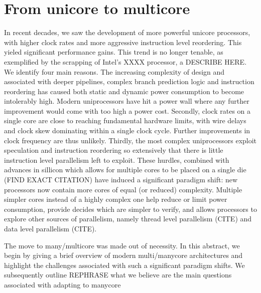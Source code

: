 \section{From unicore to multicore}

In recent decades, we saw the development of more powerful
unicore processors, with higher clock rates and more
aggressive instruction level reordering. This yieled
significant performance gains. This trend is no longer
tenable, as exemplified by the scrapping of Intel's
XXXX processor, a DESCRIBE HERE. We identify
four main reasons. The increasing complexity
of design and associated with deeper pipelines,
complex branch prediction logic and instruction
reordering has caused both static and dynamic power consumption
to become intolerably high. Modern uniprocessors have hit
a power wall where any further improvement would come
with too high a power cost. Secondly, clock rates on
a single core are close to reaching fundamental hardware limits,
with wire delays and clock skew dominating within a single clock cycle.
Further improvements in clock frequency are thus unlikely. Thirdly, the most
complex uniprocessors exploit speculation and instruction reordering so
extensively that there is little instruction level parallelism left to
exploit. These hurdles, combined with advances in sillicon which allows
for multiple cores to be placed on a single die (FIND EXACT CITATION)
have induced a significant paradigm shift: new processors now contain
more cores of equal (or reduced) complexity. Multiple simpler cores
instead of a highly complex one help reduce or limit power consumption,
provide decides which are simpler to verify, and allows processors
to explore other sources of parallelism, namely thread level parallelism (CITE)
and data level parallelism (CITE).

The move to many/multicore was made out of necessity. In this abstract, we begin
by giving a brief overview of modern multi/manycore architectures and highlight
the challenges associated with such a significant paradigm shifts. We subsequently
outline REPHRASE what we believe are the main questions associated with 
adapting to manycore


